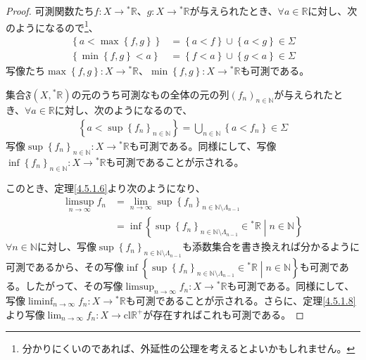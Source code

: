 \documentclass[dvipdfmx]{jsarticle}
\begin{document}
\begin{proof}
可測関数たち$f:X \rightarrow{}^{*}\mathbb{R}$、$g:X \rightarrow{}^{*}\mathbb{R}$が与えられたとき、$\forall a \in \mathbb{R}$に対し、次のようになるので\footnote{分かりにくいのであれば、外延性の公理を考えるとよいかもしれません。}、
\begin{align*}
\left\{ a < \max\left\{ f,g \right\} \right\} &= \left\{ a < f \right\} \cup \left\{ a < g \right\} \in \varSigma\\
\left\{ \min\left\{ f,g \right\} < a \right\} &= \left\{ f < a \right\} \cup \left\{ g < a \right\} \in \varSigma
\end{align*}
写像たち$\max\left\{ f,g \right\}:X \rightarrow{}^{*}\mathbb{R}$、$\min\left\{ f,g \right\}:X \rightarrow{}^{*}\mathbb{R}$も可測である。\par
集合$\mathfrak{F}\left( X,{}^{*}\mathbb{R} \right)$の元のうち可測なもの全体の元の列$\left( f_{n} \right)_{n \in \mathbb{N}}$が与えられたとき、$\forall a \in \mathbb{R}$に対し、次のようになるので、
\begin{align*}
\left\{ a < \sup\left\{ f_{n} \right\}_{n \in \mathbb{N}} \right\} = \bigcup_{n \in \mathbb{N}} \left\{ a < f_{n} \right\} \in \varSigma
\end{align*}
写像$\sup\left\{ f_{n} \right\}_{n \in \mathbb{N}}:X \rightarrow{}^{*}\mathbb{R}$も可測である。同様にして、写像$\inf\left\{ f_{n} \right\}_{n \in \mathbb{N}}:X \rightarrow{}^{*}\mathbb{R}$も可測であることが示される。\par
このとき、定理\ref{4.5.1.6}より次のようになり、
\begin{align*}
\limsup_{n \rightarrow \infty}f_{n} &= \lim_{n \rightarrow \infty}{\sup\left\{ f_{n} \right\}_{n \in \mathbb{N} \setminus \varLambda_{n - 1}}}\\
&= \inf\left\{ \sup\left\{ f_{n} \right\}_{n \in \mathbb{N} \setminus \varLambda_{n - 1}} \in{}^{*}\mathbb{R} \middle| n \in \mathbb{N} \right\}
\end{align*}
$\forall n \in \mathbb{N}$に対し、写像$\sup\left\{ f_{n} \right\}_{n \in \mathbb{N} \setminus \varLambda_{n - 1}}$も添数集合を書き換えれば分かるように可測であるから、その写像$\inf\left\{ \sup\left\{ f_{n} \right\}_{n \in \mathbb{N} \setminus \varLambda_{n - 1}} \in{}^{*}\mathbb{R} \middle| n \in \mathbb{N} \right\}$も可測である。したがって、その写像$\limsup_{n \rightarrow \infty}f_{n}:X \rightarrow{}^{*}\mathbb{R}$も可測である。同様にして、写像$\liminf_{n \rightarrow \infty}f_{n}:X \rightarrow{}^{*}\mathbb{R}$も可測であることが示される。さらに、定理\ref{4.5.1.8}より写像$\lim_{n \rightarrow \infty}f_{n}:X \rightarrow \mathrm{cl}\mathbb{R}^{+}$が存在すればこれも可測である。\par

\end{proof}
\end{document}
